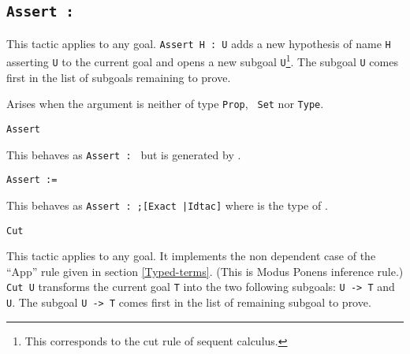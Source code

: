 \subsection{\tt Assert {\ident} : {\form}}

This tactic applies to any goal. {\tt Assert H : U} adds a new
hypothesis of name \texttt{H} asserting \texttt{U} to the current goal
and opens a new subgoal \texttt{U}\footnote{This corresponds to the
  cut rule of sequent calculus.}. The subgoal {\texttt U} comes first
in the list of subgoals remaining to prove.

\begin{ErrMsgs}
\item {}
  
  Arises when the argument {\form} is neither of type {\tt Prop}, {\tt
    Set} nor {\tt Type}.

\end{ErrMsgs}

\begin{Variants}
\item{\tt Assert {\form}}
  
  This behaves as {\tt Assert {\ident} : {\form}} but {\ident} is
  generated by {\Coq}.

\item{\tt Assert {\ident} := {\term}}
  
  This behaves as {\tt Assert {\ident} : {\type};[Exact
    {\term}|Idtac]} where {\type} is the type of {\term}.

\item {\tt Cut {\form}} 
  
  This tactic applies to any goal. It implements the non dependent
  case of the ``App'' rule given in section
  \ref{Typed-terms}. (This is Modus Ponens inference rule.)  {\tt Cut
    U} transforms the current goal \texttt{T} into the two following
  subgoals: {\tt U -> T} and \texttt{U}.  The subgoal {\tt U -> T}
  comes first in the list of remaining subgoal to prove.

\end{Variants}

